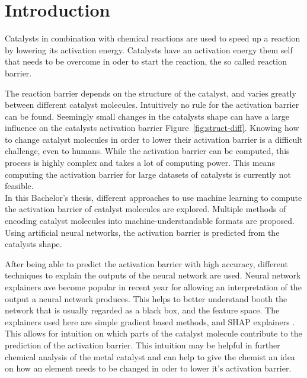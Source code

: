 
\chapter{Introduction}
\label{ch:Introduction}


Catalysts in combination with chemical reactions are used to speed up a reaction by lowering its activation energy. 
Catalysts have an activation energy them self that needs to be overcome in oder to start the reaction, the so called reaction barrier.

The reaction barrier depends on the structure of the catalyst, and varies greatly between different catalyst molecules.
Intuitively no rule for the activation barrier can be found.
Seemingly small changes in the catalysts shape can have a large influence on the catalysts activation barrier Figure~\ref{fig:struct-diff}.
Knowing how to change catalyst molecules in order to lower their activation barrier is a difficult challenge, even to humans. %
While the activation barrier can be computed, this process is highly complex and takes a lot of computing power.
This means computing the activation barrier for large datasets of catalysts is currently not feasible.
\\
In this Bachelor's thesis, different approaches to use machine learning to compute the activation barrier of catalyst molecules are explored.
Multiple methods of encoding catalyst molecules into machine-understandable formats are proposed.
Using artificial neural networks, the activation barrier is predicted from the catalysts shape.

After being able to predict the activation barrier with high accuracy, different techniques to explain the 
outputs of the neural network are used.
Neural network explainers ave become popular in recent year for allowing an interpretation of the output
a neural network produces. 
This helps to better understand booth the network that is usually regarded as a black box, and the feature space.
The explainers used here are simple gradient based methods, and SHAP explainers \cite{NIPS2017_7062}.
This allows for intuition on which parts of the catalyst molecule contribute to the prediction of the activation barrier.
This intuition may be helpful in further chemical analysis of the metal catalyst and can help to give the 
chemist an idea on how an element needs to be changed in oder to lower it's activation barrier.
\\

